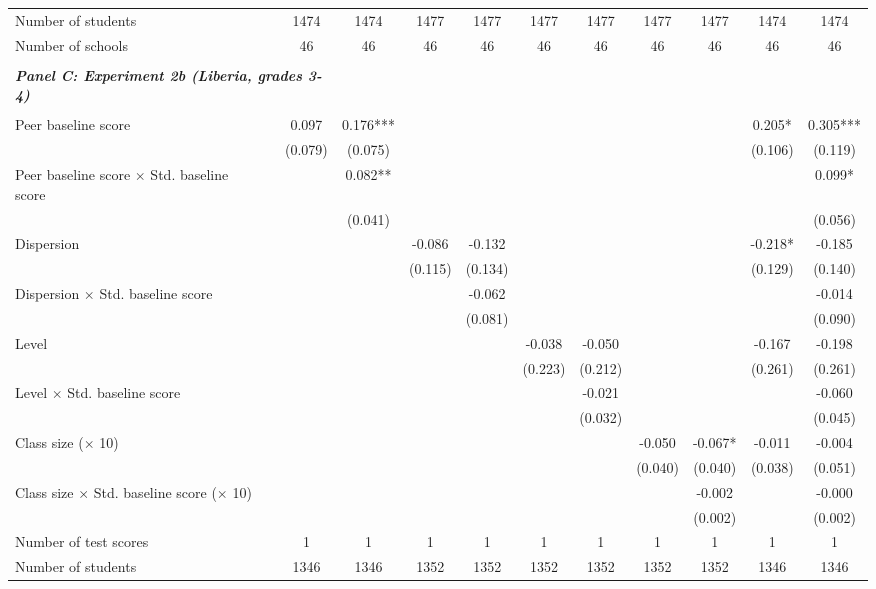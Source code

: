 \begin{center}
\begin{scriptsize}
\begin{threeparttable}
\begin{tabular} {@{} l l c c c c c c c c c c  @{}}
Number of students &  & 1474 & 1474 & 1477 & 1477 & 1477 & 1477 & 1477 & 1477 & 1474 & 1474 \\
Number of schools &  & 46 & 46 & 46 & 46 & 46 & 46 & 46 & 46 & 46 & 46 \\
 \midrule
\\
\multicolumn{3}{l}{\textbf{\textit{Panel C: Experiment 2b (Liberia, grades 3-4)}}} \\
\\
Peer baseline score &  & 0.097 & 0.176*** &  &  &  &  &  &  & 0.205* & 0.305*** \\
                 &  & (0.079) & (0.075) &  &  &  &  &  &  & (0.106) & (0.119) \\
Peer baseline score $\times$ Std. baseline score &  &  & 0.082** &  &  &  &  &  &  &  & 0.099* \\
                 &  &  & (0.041) &  &  &  &  &  &  &  & (0.056) \\
Dispersion &  &  &  & -0.086 & -0.132 &  &  &  &  & -0.218* & -0.185 \\
                 &  &  &  & (0.115) & (0.134) &  &  &  &  & (0.129) & (0.140) \\
Dispersion $\times$ Std. baseline score &  &  &  &  & -0.062 &  &  &  &  &  & -0.014 \\
                 &  &  &  &  & (0.081) &  &  &  &  &  & (0.090) \\
Level &  &  &  &  &  & -0.038 & -0.050 &  &  & -0.167 & -0.198 \\
                 &  &  &  &  &  & (0.223) & (0.212) &  &  & (0.261) & (0.261) \\
Level $\times$ Std. baseline score &  &  &  &  &  &  & -0.021 &  &  &  & -0.060 \\
                 &  &  &  &  &  &  & (0.032) &  &  &  & (0.045) \\
Class size ($\times$ 10) &  &  &  &  &  &  &  & -0.050 & -0.067* & -0.011 & -0.004 \\
                 &  &  &  &  &  &  &  & (0.040) & (0.040) & (0.038) & (0.051) \\
Class size $\times$ Std. baseline score ($\times$ 10) &  &  &  &  &  &  &  &  & -0.002 &  & -0.000 \\
                 &  &  &  &  &  &  &  &  & (0.002) &  & (0.002) \\
\midrule
Number of test scores &  & 1 & 1 & 1 & 1 & 1 & 1 & 1 & 1 & 1 & 1 \\
Number of students &  & 1346 & 1346 & 1352 & 1352 & 1352 & 1352 & 1352 & 1352 & 1346 & 1346 \\

\end{tabular}
\end{threeparttable}
\end{scriptsize}
\end{center}
